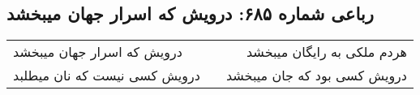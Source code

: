 \begin{center}
\section*{رباعی شماره ۶۸۵: درویش که اسرار جهان میبخشد}
\label{sec:0685}
\begin{longtable}{l p{0.5cm} r}
درویش که اسرار جهان میبخشد
&&
هردم ملکی به رایگان میبخشد
\\
درویش کسی نیست که نان میطلبد
&&
درویش کسی بود که جان میبخشد
\\
\end{longtable}
\end{center}
